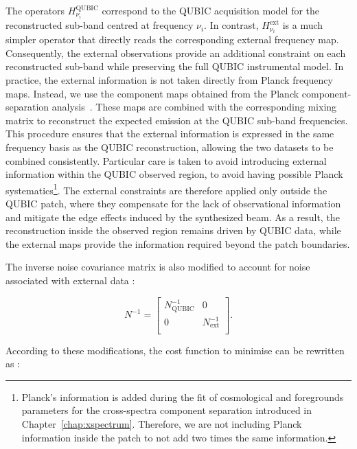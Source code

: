 \documentclass[../../thesis.tex]{subfiles}
\begin{document}
The operators $H^{\mathrm{QUBIC}}_{\nu_i}$ correspond to the QUBIC acquisition model for the reconstructed sub-band centred at frequency $\nu_i$. In contrast, $H^{\mathrm{ext}}_{\nu_i}$ is a much simpler operator that directly reads the corresponding external frequency map. Consequently, the external observations provide an additional constraint on each reconstructed sub-band while preserving the full QUBIC instrumental model.
In practice, the external information is not taken directly from Planck frequency maps. Instead, we use the component maps obtained from the Planck component-separation analysis~\cite{Planck2018IV}. These maps are combined with the corresponding mixing matrix to reconstruct the expected emission at the QUBIC sub-band frequencies. This procedure ensures that the external information is expressed in the same frequency basis as the QUBIC reconstruction, allowing the two datasets to be combined consistently.
Particular care is taken to avoid introducing external information within the QUBIC observed region, to avoid having possible Planck systematics\footnote{Planck's information is added during the fit of cosmological and foregrounds parameters for the cross-spectra component separation introduced in Chapter~\ref{chap:xspectrum}. Therefore, we are not including Planck information inside the patch to not add two times the same information.}. The external constraints are therefore applied only outside the QUBIC patch, where they compensate for the lack of observational information and mitigate the edge effects induced by the synthesized beam. As a result, the reconstruction inside the observed region remains driven by QUBIC data, while the external maps provide the information required beyond the patch boundaries.

The inverse noise covariance matrix is also modified to account for noise associated with external data :

\begin{equation}
    N^{-1} = \begin{bmatrix}
        N^{-1}_{\text{QUBIC}} & 0 \\
        0 & N^{-1}_{\text{ext}} \\
        \end{bmatrix}.
\end{equation}

According to these modifications, the cost function to minimise can be rewritten as : 
\end{document}
